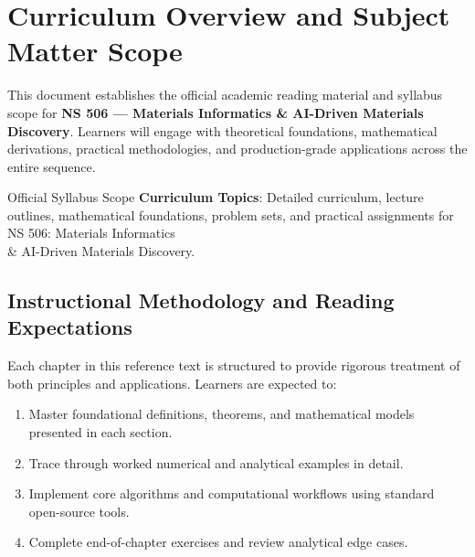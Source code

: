 \section{Curriculum Overview and Subject Matter Scope}

This document establishes the official academic reading material and syllabus scope for \textbf{NS 506 --- Materials Informatics \& AI-Driven Materials Discovery}. Learners will engage with theoretical foundations, mathematical derivations, practical methodologies, and production-grade applications across the entire sequence.

\begin{InsightBox}{Official Syllabus Scope}
  \textbf{Curriculum Topics}: Detailed curriculum, lecture outlines, mathematical foundations, problem sets, and practical assignments for NS 506: Materials Informatics \\& AI-Driven Materials Discovery.
\end{InsightBox}

\subsection{Instructional Methodology and Reading Expectations}

Each chapter in this reference text is structured to provide rigorous treatment of both principles and applications. Learners are expected to:
\begin{enumerate}
  \item Master foundational definitions, theorems, and mathematical models presented in each section.
  \item Trace through worked numerical and analytical examples in detail.
  \item Implement core algorithms and computational workflows using standard open-source tools.
  \item Complete end-of-chapter exercises and review analytical edge cases.
\end{enumerate}

